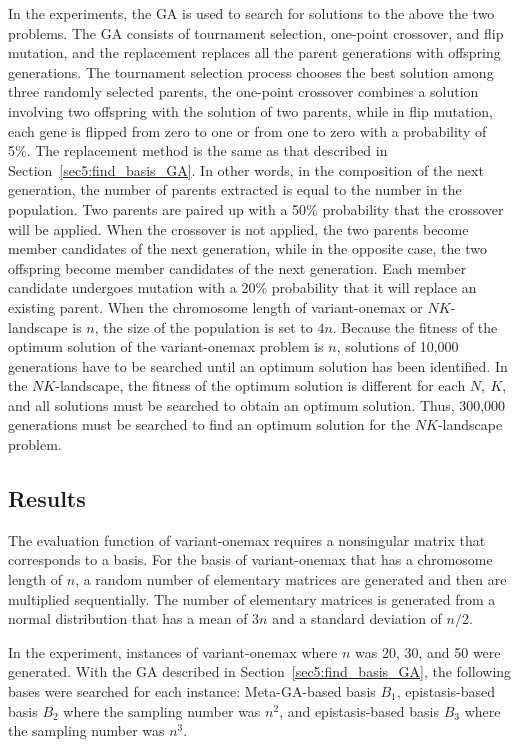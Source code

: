 In the experiments, the GA is used to search for solutions to the above the two problems. The GA consists of tournament selection, one-point crossover, and flip mutation, and the replacement replaces all the parent generations with offspring generations. The tournament selection process chooses the best solution among three randomly selected parents, the one-point crossover combines a solution involving two offspring with the solution of two parents, while in flip mutation, each gene is flipped from zero to one or from one to zero with a probability of 5\%. The replacement method is the same as that described in Section~\ref{sec5:find_basis_GA}. In other words, in the composition of the next generation, the number of parents extracted is equal to the number in the population. Two parents are paired up with a 50\% probability that the crossover will be applied. When the crossover is not applied, the two parents become member candidates of the next generation, while in the opposite case, the two offspring become member candidates of the next generation. Each member candidate undergoes mutation with a 20\% probability that it will replace an existing parent. When the chromosome length of variant-onemax or $ NK $-landscape is $ n $, the size of the population is set to $ 4n $. Because the fitness of the optimum solution of the variant-onemax problem is $ n $, solutions of 10,000 generations have to be searched until an optimum solution has been identified. In the $ NK $-landscape, the fitness of the optimum solution is different for each $ N,\ K $, and all solutions must be searched to obtain an optimum solution. Thus, 300,000 generations must be searched to find an optimum solution for the $ NK $-landscape problem.

\subsection{Results}
The evaluation function of variant-onemax requires a nonsingular matrix that corresponds to a basis. For the basis of variant-onemax that has a chromosome length of $ n $, a random number of elementary matrices are generated and then are multiplied sequentially. The number of elementary matrices is generated from a normal distribution that has a mean of $ 3n $ and a standard deviation of $ n/2 $.

In the experiment, instances of variant-onemax where $ n $ was 20, 30, and 50 were generated. With the GA described in Section~\ref{sec5:find_basis_GA}, the following bases were searched for each instance: Meta-GA-based basis $ B_1 $, epistasis-based basis $ B_2 $ where the sampling number was $ n^2 $, and epistasis-based basis $ B_3 $ where the sampling number was $ n^3 $.

